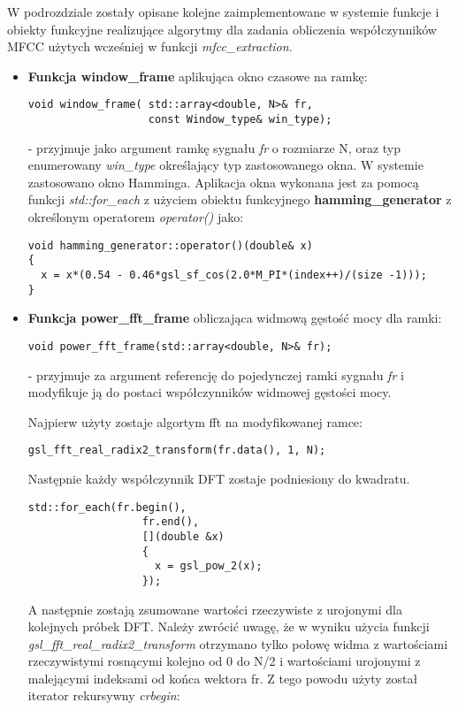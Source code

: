 W podrozdziale zostały opisane kolejne zaimplementowane w systemie funkcje i obiekty funkcyjne realizujące algorytmy dla zadania obliczenia współczynników MFCC użytych wcześniej w funkcji \textit{mfcc\_extraction}. 
\begin{itemize}
\item{\textbf{Funkcja window\_frame} aplikująca okno czasowe na ramkę:
 \begin{lstlisting}[style=lst:cpp]
void window_frame( std::array<double, N>& fr,
                   const Window_type& win_type);
\end{lstlisting}
}
 - przyjmuje jako argument ramkę sygnału \textit{fr} o rozmiarze N, oraz typ enumerowany \textit{win\_type} określający typ zastosowanego okna. W systemie zastosowano okno Hamminga. Aplikacja okna wykonana jest za pomocą funkcji \textit{std::for\_each} z użyciem obiektu funkcyjnego \textbf{hamming\_generator} z określonym operatorem \textit{operator()} jako:
 \begin{lstlisting}[style=lst:cpp]
void hamming_generator::operator()(double& x) 
{
  x = x*(0.54 - 0.46*gsl_sf_cos(2.0*M_PI*(index++)/(size -1)));
}
\end{lstlisting}

\item{\textbf{Funkcja power\_fft\_frame} obliczająca widmową gęstość mocy dla ramki:
 \begin{lstlisting}[style=lst:cpp]
  void power_fft_frame(std::array<double, N>& fr);
\end{lstlisting}
}
- przyjmuje za argument referencję do pojedynczej ramki sygnału \textit{fr} i modyfikuje ją do postaci współczynników widmowej gęstości mocy. 

Najpierw użyty zostaje algortym fft na modyfikowanej ramce:
\begin{lstlisting}[style=lst:cpp]
    gsl_fft_real_radix2_transform(fr.data(), 1, N);
\end{lstlisting}

Następnie każdy współczynnik DFT zostaje podniesiony do kwadratu.
\begin{lstlisting}[style=lst:cpp]
    std::for_each(fr.begin(),
                  fr.end(),
                  [](double &x)
                  {
                    x = gsl_pow_2(x);
                  });
\end{lstlisting}

A następnie zostają zsumowane wartości rzeczywiste z urojonymi dla kolejnych próbek DFT. Należy zwrócić uwagę, że w wyniku użycia funkcji \textit{gsl\_fft\_real\_radix2\_transform} otrzymano tylko połowę widma z wartościami rzeczywistymi rosnącymi kolejno od 0 do N/2 i wartościami urojonymi z malejącymi indeksami od końca wektora fr. Z tego powodu użyty został iterator rekursywny \textit{crbegin}:


\end{itemize}
